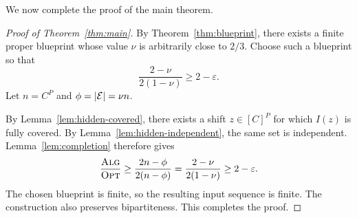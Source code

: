 We now complete the proof of the main theorem.

\begin{proof}[Proof of Theorem~\ref{thm:main}]
By Theorem~\ref{thm:blueprint}, there exists a finite proper blueprint whose value $\nu$ is arbitrarily close to $2/3$. Choose such a blueprint so that
$$
\frac{2-\nu}{2(1-\nu)}
\geq
2-\varepsilon.
$$
Let $n=C^P$ and $\phi=|\mathcal{E}|=\nu n$.

By Lemma~\ref{lem:hidden-covered}, there exists a shift $z\in[C]^P$ for which $I(z)$ is fully covered. By Lemma~\ref{lem:hidden-independent}, the same set is independent. Lemma~\ref{lem:completion} therefore gives
$$
\frac{\textsc{Alg}}{\textsc{Opt}}
\geq
\frac{2n-\phi}{2(n-\phi)}
=
\frac{2-\nu}{2(1-\nu)}
\geq
2-\varepsilon.
$$
The chosen blueprint is finite, so the resulting input sequence is finite. The construction also preserves bipartiteness. This completes the proof.
\end{proof}
